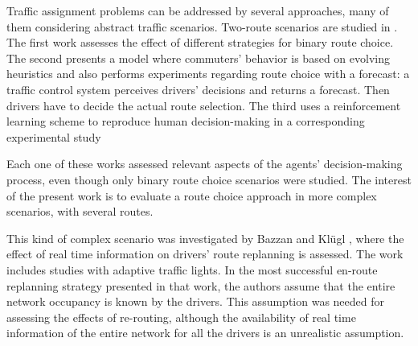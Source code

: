\documentclass{RITA}
\begin{document}



Traffic assignment problems can be addressed by several approaches, many of them considering abstract traffic scenarios. Two-route scenarios are studied in \cite{Bazzan+2000icmas,Kluegl&Bazzan2004jasss,Chmura&Pitz2007}. The first work assesses the effect of different strategies for binary route choice. The second presents a model where commuters' behavior is based on evolving heuristics and also performs experiments regarding route choice with a forecast: a traffic control system perceives drivers' decisions and returns a forecast. Then drivers have to decide the actual route selection. The third uses a reinforcement learning scheme to reproduce human decision-making in a corresponding experimental study

Each one of these works assessed relevant aspects of the agents' decision-making process, even though only binary route choice scenarios were studied. The interest of the present work is to evaluate a route choice approach in more complex scenarios, with several routes.

This kind of complex scenario was investigated by Bazzan and Kl\"ugl \cite{Bazzan&Kluegl2008}, where the effect of real time information on drivers' route replanning is assessed. The work includes studies with adaptive traffic lights. In the most successful en-route replanning strategy presented in that work, the authors assume that the entire network occupancy is known by the drivers. This assumption was needed for assessing the effects of re-routing, although the availability of real time information of the entire network for all the drivers is an unrealistic assumption.
\end{document}
